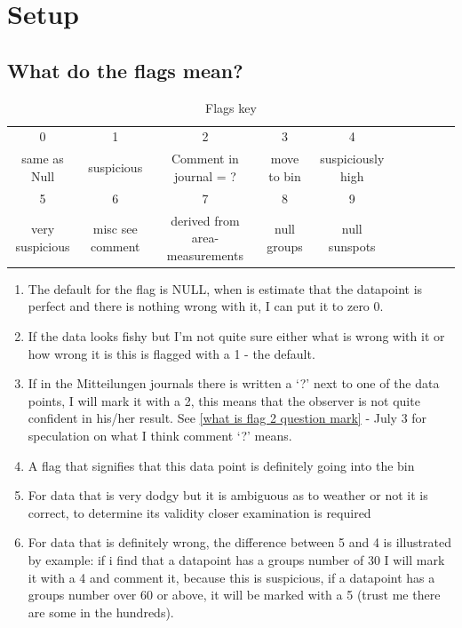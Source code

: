 \documentclass[12pt]{article}
\begin{document}
\section{Setup}

\subsection{What do the flags mean?}\label{flags section}
\newpage%
\begin{table}[h!]
    \centering
    \begin{tabular}{c|c|c|c|c|c|c|c|c|c}
        0 & 1 & 2 & 3 & 4 \\
        same as Null & suspicious & Comment in journal = ? & move to bin & suspiciously high\\
        \hline
        5 & 6 & 7 & 8 & 9\\
        very suspicious & misc see comment & derived from area-measurements & null groups & null sunspots
         
    \end{tabular}
    \caption{Flags key}
    \label{tab:flag}
\end{table}
\begin{enumerate}[start=0]
    \item The default for the flag is NULL, when is estimate that the datapoint is perfect and there is nothing wrong with it, I can put it to zero 0.
    \item If the data looks fishy but I'm not quite sure either what is wrong with it or how wrong it is this is flagged with a 1 - the default.
    \item If in the Mitteilungen journals there is written a `?' next to one of the data points, I will mark it with a 2, this means that the observer is not quite confident in his/her result. See \ref{what is flag 2 question mark} - July 3 for speculation on what I think comment `?' means.
    \item A flag that signifies that this data point is definitely going into the bin
    \item For data that is very dodgy but it is ambiguous as to weather or not it is correct, to determine its validity closer examination is required
    \item For data that is definitely wrong, the difference between 5 and 4 is illustrated by example: if i find that a datapoint has a groups number of 30 I will mark it with a 4 and comment it, because this is suspicious, if a datapoint has a groups number over 60 or above, it will be marked with a 5 (trust me there are some in the hundreds).
\end{enumerate}
\end{document}
